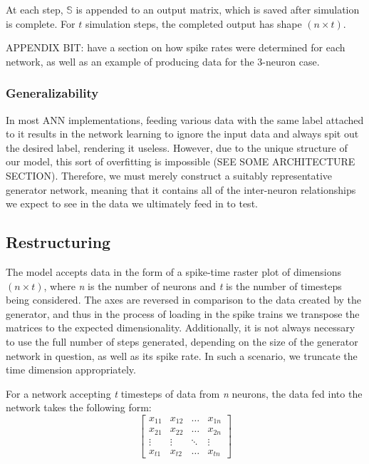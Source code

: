 At each step, $\mathbb{S}$ is appended to an output matrix, which is saved after 
simulation is complete. For $t$ simulation steps, the completed output has shape 
$(n \times t)$.

APPENDIX BIT: have a section on how spike rates were determined for each 
network, as well as an example of producing data for the 3-neuron case.

\subsubsection{Generalizability}
\label{subsubsec:hotswap}
In most ANN implementations, feeding various data with the same label attached 
to it results in the network learning to ignore the input data and always spit 
out the desired label, rendering it useless. However, due to the unique 
structure of our model, this sort of overfitting is impossible (SEE SOME 
ARCHITECTURE SECTION). Therefore, we must merely construct a suitably 
representative generator network, meaning that it contains all of the 
inter-neuron relationships we expect to see in the data we ultimately feed in to 
test.

\subsection{Restructuring}
The model accepts data in the form of a spike-time raster plot of dimensions $(n 
\times t)$, where \textit{n} is the number of neurons and \textit{t} is the 
number of timesteps being considered. The axes are reversed in comparison to the 
data created by the generator, and thus in the process of loading in the spike 
trains we transpose the matrices to the expected dimensionality. Additionally, 
it is not always necessary to use the full number of steps generated, depending 
on the size of the generator network in question, as well as its spike rate. In 
such a scenario, we truncate the time dimension appropriately.

For a network accepting \textit{t} timesteps of data from \textit{n} neurons, 
the data fed into the network takes the following form:
\[ \begin{bmatrix}
		x_{11} & x_{12} & \dots & x_{1n}\\
		x_{21} & x_{22} & \dots & x_{2n}\\
		\vdots & \vdots & \ddots & \vdots\\
		x_{t1} & x_{t2} & \dots & x_{tn}
	\end{bmatrix} \]

